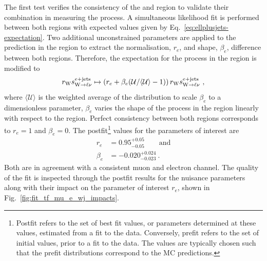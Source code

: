 The first test verifies the consistency of the \muplusjets and \eleplusjets region to validate their combination in measuring the \IWj process. A simultaneous likelihood fit is performed between both regions with expected values given by Eq.~\ref{eq:ellplusjets-expectation}. Two additional unconstrained parameters are applied to the \IWj prediction in the \eleplusjets region to extract the normalisation, $r_e$, and shape, $\beta_e$, difference between both regions. Therefore, the expectation for the \IWj process in the \eleplusjets region is modified to
%
\begin{equation}
    r_{\PW}s_{\IWlv}^{\eleplusjets}\mapsto \left(r_e + \beta_{e}(\recoil/\langle\recoil\rangle-1)\right)r_{\PW}s_{\IWlv}^{\eleplusjets}\ ,
\end{equation}
%
where $\langle \mathcal{U} \rangle$ is the weighted average of the \recoil distribution to scale $\beta_e$ to a dimensionless parameter, $\beta_e$ varies the shape of the \IWj process in the \eleplusjets region linearly with respect to the \muplusjets region. Perfect consistency between both regions corresponds to $r_e=1$ and $\beta_e=0$. The postfit\footnote{Postfit refers to the set of best fit values, or parameters determined at these values, estimated from a fit to the data. Conversely, prefit refers to the set of initial values, prior to a fit to the data. The values are typically chosen such that the prefit distributions correspond to the MC predictions.} values for the parameters of interest are
%
\begin{align}
    r_e & = 0.95^{+0.05}_{-0.05}\qquad \mathrm{and}\nonumber\\
    \beta_e & = -0.020^{+0.024}_{-0.023}\ .
\end{align}
%
Both are in agreement with a consistent muon and electron channel. The quality of the fit is inspected through the postfit results for the nuisance parameters along with their impact on the parameter of interest $r_e$, shown in Fig.~\ref{fig:fit_tf_mu_e_wj_impacts}.
%
